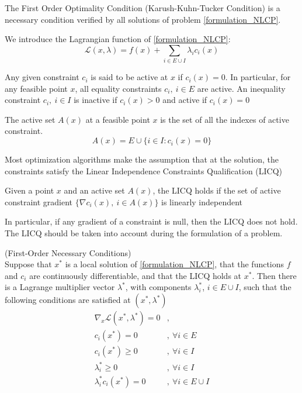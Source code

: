The First Order Optimality Condition (Karush-Kuhn-Tucker Condition) is a necessary condition verified by all solutions of problem \ref{formulation_NLCP}.

We introduce the Lagrangian function of \ref{formulation_NLCP}:
\begin{equation}
  \mathcal{L}(x,\lambda) = f(x) + \sum_{i\in E\cup I}\lambda_i c_i(x)
\end{equation}

Any given constraint $c_i$ is said to be active at $x$ if $c_i(x)=0$.
In particular, for any feasible point $x$, all equality constraints $c_i,\ i\in E$ are active. 
An inequality constraint $c_i,\ i\in I$ is inactive if $c_i(x)>0$ and active if $c_i(x) = 0$

\begin{definition}  
  \label{active_set}
  The active set $\mathit{A}(x)$ at a feasible point $x$ is the set of all the indexes of active constraint.
  \begin{equation}
    \mathit{A}(x)=E\cup\{i\in I: c_i(x) = 0\}
  \end{equation}
\end{definition}

Most optimization algorithms make the assumption that at the solution, the constraints satisfy the Linear Independence Constraints Qualification (LICQ)

\begin{definition}
  Given a point $x$ and an active set $\mathit{A}(x)$, the LICQ holds if the set of active constraint gradient $\{\nabla c_i(x),\ i\in \mathit{A}(x)\}$ is linearly independent
\end{definition}

In particular, if any gradient of a constraint is null, then the LICQ does not hold. 
The LICQ should be taken into account during the formulation of a problem.

\begin{theorem}(First-Order Necessary Conditions)\\
  \label{KKT_conditions}
  Suppose that $x^*$ is a local solution of \ref{formulation_NLCP}, that the functions $f$ and $c_i$ are continuously differentiable, and that the LICQ holds at $x^*$.
  Then there is a Lagrange multiplier vector $\lambda^*$, with components $\lambda_i^*$, $i\in E\cup I$, such that the following conditions are satisfied at $(x^*,\lambda^*)$
  \begin{equation}
  \begin{array}{ll}
    \nabla_x\mathcal{L}(x^*,\lambda^*) = 0 &, \\
    c_i(x^*) = 0 &,\ \forall i\in E\\
    c_i(x^*) \geq 0 &,\ \forall i\in I\\
    \lambda_i^* \geq 0 &,\ \forall i\in I\\
    \lambda_i^* c_i(x^*)=0 &,\ \forall i \in E\cup I\\
  \end{array}
  \end{equation}
\end{theorem}

